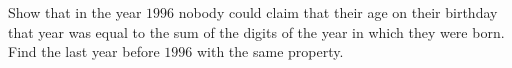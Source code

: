 Show that in the year $1996$ nobody could claim that their age on their birthday that year was equal to the sum of the digits of the year in which they were born. Find the last year before $1996$ with the same property.
